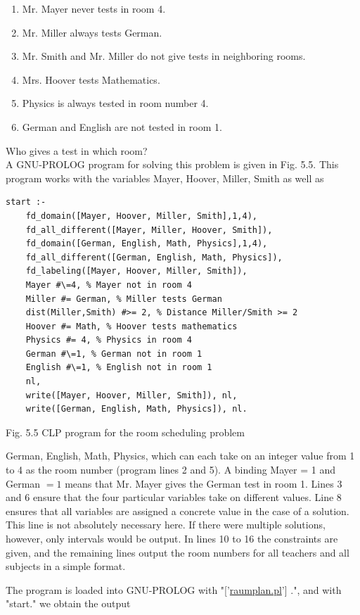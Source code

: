 \documentclass[10pt]{book}
\begin{document}
\begin{enumerate}
  \item Mr. Mayer never tests in room 4.
  \item Mr. Miller always tests German.
  \item Mr. Smith and Mr. Miller do not give tests in neighboring rooms.
  \item Mrs. Hoover tests Mathematics.
  \item Physics is always tested in room number 4.
  \item German and English are not tested in room 1.
\end{enumerate}

Who gives a test in which room?\\
A GNU-PROLOG program for solving this problem is given in Fig. 5.5. This program works with the variables Mayer, Hoover, Miller, Smith as well as

\begin{verbatim}
start :-
    fd_domain([Mayer, Hoover, Miller, Smith],1,4),
    fd_all_different([Mayer, Miller, Hoover, Smith]),
    fd_domain([German, English, Math, Physics],1,4),
    fd_all_different([German, English, Math, Physics]),
    fd_labeling([Mayer, Hoover, Miller, Smith]),
    Mayer #\=4, % Mayer not in room 4
    Miller #= German, % Miller tests German
    dist(Miller,Smith) #>= 2, % Distance Miller/Smith >= 2
    Hoover #= Math, % Hoover tests mathematics
    Physics #= 4, % Physics in room 4
    German #\=1, % German not in room 1
    English #\=1, % English not in room 1
    nl,
    write([Mayer, Hoover, Miller, Smith]), nl,
    write([German, English, Math, Physics]), nl.
\end{verbatim}

Fig. 5.5 CLP program for the room scheduling problem

German, English, Math, Physics, which can each take on an integer value from 1 to 4 as the room number (program lines 2 and 5). A binding Mayer = 1 and German $=1$ means that Mr. Mayer gives the German test in room 1. Lines 3 and 6 ensure that the four particular variables take on different values. Line 8 ensures that all variables are assigned a concrete value in the case of a solution. This line is not absolutely necessary here. If there were multiple solutions, however, only intervals would be output. In lines 10 to 16 the constraints are given, and the remaining lines output the room numbers for all teachers and all subjects in a simple format.

The program is loaded into GNU-PROLOG with "['\href{http://raumplan.pl}{raumplan.pl}'] .", and with "start." we obtain the output
\end{document}
